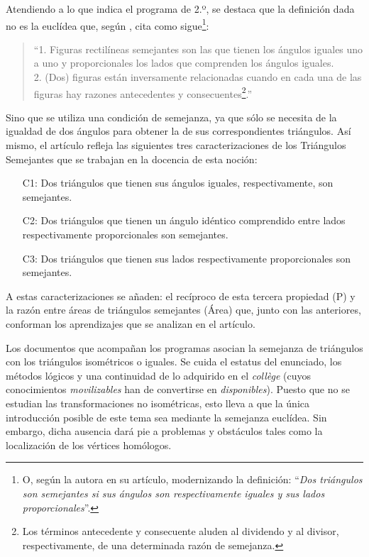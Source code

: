 	Atendiendo a lo que indica el programa de 2.º, se destaca que la definición dada no es la euclídea que, según \citet[p. 55]{Elementos}, cita como sigue\footnote{O, según la autora en su artículo, modernizando la definición: ``\textit{Dos triángulos son semejantes si sus ángulos son respectivamente iguales y sus lados proporcionales}''.}:
	
	\begin{quote}\small
		``1. Figuras rectilíneas semejantes son las que tienen los ángulos iguales uno a uno y proporcionales los lados que comprenden los ángulos iguales.\\
		2. (Dos) figuras están inversamente relacionadas cuando en cada una de las figuras hay razones antecedentes y consecuentes\footnote{Los términos antecedente y consecuente aluden al dividendo y al divisor, respectivamente, de una determinada razón de semejanza.}.''
	\end{quote}
	
	 Sino que se utiliza una condición de semejanza, ya que sólo se necesita de la igualdad de dos ángulos para obtener la de sus correspondientes triángulos. Así mismo, el artículo refleja las siguientes tres caracterizaciones de los Triángulos Semejantes que se trabajan en la docencia de esta noción:
	\begin{itemize}
		\item[C1:] Dos triángulos que tienen sus ángulos iguales, respectivamente, son semejantes.\label{C1}
		\item[C2:] Dos triángulos que tienen un ángulo idéntico comprendido entre lados respectivamente proporcionales son semejantes.
		\item[C3:] Dos triángulos que tienen sus lados respectivamente proporcionales son semejantes.
	\end{itemize}

	A estas caracterizaciones se añaden: el recíproco de esta tercera propiedad (P) y la razón entre áreas de triángulos semejantes (Área) que, junto con las anteriores, conforman los aprendizajes que se analizan en el artículo.
	
	Los documentos que acompañan los programas asocian la semejanza de triángulos con los triángulos isométricos o iguales. Se cuida el estatus del enunciado, los métodos lógicos y una continuidad de lo adquirido en el \textit{collège} (cuyos conocimientos \textit{movilizables} han de convertirse en \textit{disponibles}). Puesto que no se estudian las transformaciones no isométricas, esto lleva a que la única introducción posible de este tema sea mediante la semejanza euclídea. Sin embargo, dicha ausencia dará pie a problemas y obstáculos tales como la localización de los vértices homólogos.
	
